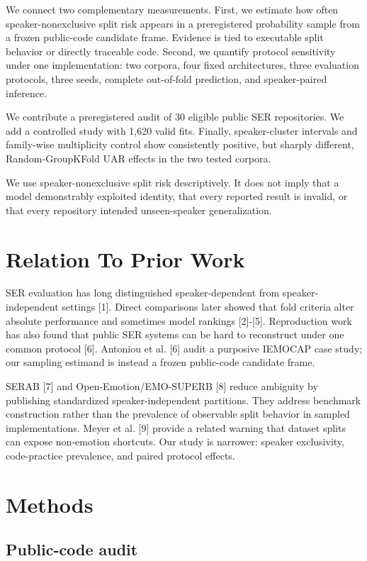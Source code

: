 \documentclass{article}
\begin{document}
We connect two complementary measurements.
First, we estimate how often speaker-nonexclusive split risk appears in a preregistered probability sample from a frozen public-code candidate frame.
Evidence is tied to executable split behavior or directly traceable code.
Second, we quantify protocol sensitivity under one implementation: two corpora, four fixed architectures, three evaluation protocols, three seeds, complete out-of-fold prediction, and speaker-paired inference.

We contribute a preregistered audit of 30 eligible public SER repositories.
We add a controlled study with 1,620 valid fits.
Finally, speaker-cluster intervals and family-wise multiplicity control show consistently positive, but sharply different, Random-GroupKFold UAR effects in the two tested corpora.

We use speaker-nonexclusive split risk descriptively.
It does not imply that a model demonstrably exploited identity, that every reported result is invalid, or that every repository intended unseen-speaker generalization.

\section{Relation To Prior Work}

SER evaluation has long distinguished speaker-dependent from speaker-independent settings [1].
Direct comparisons later showed that fold criteria alter absolute performance and sometimes model rankings [2]-[5].
Reproduction work has also found that public SER systems can be hard to reconstruct under one common protocol [6].
Antoniou et al. [6] audit a purposive IEMOCAP case study; our sampling estimand is instead a frozen public-code candidate frame.

SERAB [7] and Open-Emotion/EMO-SUPERB [8] reduce ambiguity by publishing standardized speaker-independent partitions.
They address benchmark construction rather than the prevalence of observable split behavior in sampled implementations.
Meyer et al. [9] provide a related warning that dataset splits can expose non-emotion shortcuts.
Our study is narrower: speaker exclusivity, code-practice prevalence, and paired protocol effects.

\section{Methods}

\subsection{Public-code audit}
\end{document}
